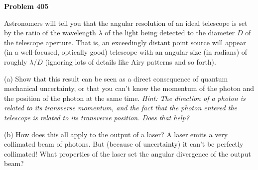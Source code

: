 \documentclass[12pt]{article}
\begin{document}
\begin{pottproblem}
\textbf{Problem 405}

Astronomers will tell you that the angular resolution of an ideal telescope is
set by the ratio of the wavelength $\lambda$ of the light being detected
to the diameter $D$ of the telescope aperture. That is, an exceedingly distant
point source will appear (in a well-focused, optically good) telescope with
an angular size (in radians) of roughly $\lambda / D$ (ignoring lots of details
like Airy patterns and so forth).

(a) Show that this result can be seen as a direct consequence of quantum
mechanical uncertainty, or that you can't know the momentum of the photon and
the position of the photon at the same time. \textsl{Hint: The direction of
  a photon is related to its transverse momentum, and the fact that the
  photon entered the telescope is related to its transverse position. Does
  that help?}

(b) How does this all apply to the output of a laser? A laser emits a very
collimated beam of photons. But (because of uncertainty) it can't be perfectly
collimated! What properties of the laser set the angular divergence
of the output beam?

\end{pottproblem}
\end{document}
